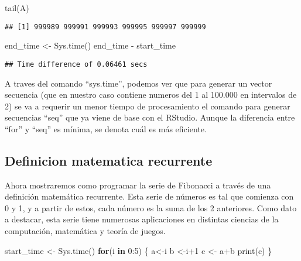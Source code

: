 \documentclass[]{elsarticle} %
\newenvironment{Shaded}{\begin{snugshade}}{\end{snugshade}}
\newcommand{\ControlFlowTok}[1]{\textcolor[rgb]{0.13,0.29,0.53}{\textbf{#1}}}
\newcommand{\DecValTok}[1]{\textcolor[rgb]{0.00,0.00,0.81}{#1}}
\newcommand{\FunctionTok}[1]{\textcolor[rgb]{0.00,0.00,0.00}{#1}}
\newcommand{\NormalTok}[1]{#1}
\newcommand{\OtherTok}[1]{\textcolor[rgb]{0.56,0.35,0.01}{#1}}
\newcommand{\SpecialCharTok}[1]{\textcolor[rgb]{0.00,0.00,0.00}{#1}}
\begin{document}
\begin{Shaded}
\begin{Highlighting}[]
\FunctionTok{tail}\NormalTok{(A)}
\end{Highlighting}
\end{Shaded}

\begin{verbatim}
## [1] 999989 999991 999993 999995 999997 999999
\end{verbatim}

\begin{Shaded}
\begin{Highlighting}[]
\NormalTok{end\_time }\OtherTok{\textless{}{-}} \FunctionTok{Sys.time}\NormalTok{()}
\NormalTok{end\_time }\SpecialCharTok{{-}}\NormalTok{ start\_time}
\end{Highlighting}
\end{Shaded}

\begin{verbatim}
## Time difference of 0.06461 secs
\end{verbatim}

A traves del comando ``sys.time'', podemos ver que para generar un
vector secuencia (que en nuestro caso contiene numeros del 1 al 100.000
en intervalos de 2) se va a requerir un menor tiempo de procesamiento el
comando para generar secuencias ``seq'' que ya viene de base con el
RStudio. Aunque la diferencia entre ``for'' y ``seq'' es mínima, se
denota cuál es más eficiente.

\hypertarget{definicion-matematica-recurrente}{%
\subsection{Definicion matematica
recurrente}\label{definicion-matematica-recurrente}}

Ahora mostraremos como programar la serie de Fibonacci a través de una
definición matemática recurrente. Esta serie de números es tal que
comienza con 0 y 1, y a partir de estos, cada número es la suma de los 2
anteriores. Como dato a destacar, esta serie tiene numerosas
aplicaciones en distintas ciencias de la computación, matemática y
teoría de juegos.

\begin{Shaded}
\begin{Highlighting}[]
\NormalTok{start\_time }\OtherTok{\textless{}{-}} \FunctionTok{Sys.time}\NormalTok{()}
\ControlFlowTok{for}\NormalTok{(i }\ControlFlowTok{in} \DecValTok{0}\SpecialCharTok{:}\DecValTok{5}\NormalTok{)}
\NormalTok{\{ a}\OtherTok{\textless{}{-}}\NormalTok{i}
\NormalTok{b }\OtherTok{\textless{}{-}}\NormalTok{i}\SpecialCharTok{+}\DecValTok{1}
\NormalTok{c }\OtherTok{\textless{}{-}}\NormalTok{ a}\SpecialCharTok{+}\NormalTok{b}
\FunctionTok{print}\NormalTok{(c)}
\NormalTok{\}}
\end{Highlighting}
\end{Shaded}
\end{document}
